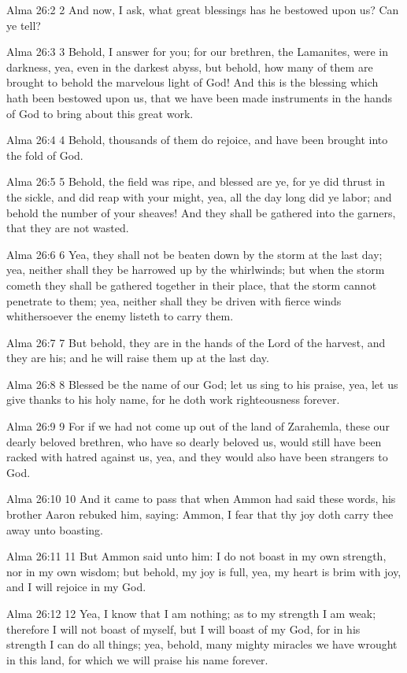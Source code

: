 Alma 26:2
 2 And now, I ask, what great blessings has he bestowed upon us?
Can ye tell?

Alma 26:3
 3 Behold, I answer for you; for our brethren, the Lamanites,
were in darkness, yea, even in the darkest abyss, but behold, how
many of them are brought to behold the marvelous light of God!
And this is the blessing which hath been bestowed upon us, that
we have been made instruments in the hands of God to bring about
this great work.

Alma 26:4
 4 Behold, thousands of them do rejoice, and have been brought
into the fold of God.

Alma 26:5
 5 Behold, the field was ripe, and blessed are ye, for ye did
thrust in the sickle, and did reap with your might, yea, all the
day long did ye labor; and behold the number of your sheaves!
And they shall be gathered into the garners, that they are not
wasted.

Alma 26:6
 6 Yea, they shall not be beaten down by the storm at the last
day; yea, neither shall they be harrowed up by the whirlwinds;
but when the storm cometh they shall be gathered together in
their place, that the storm cannot penetrate to them; yea,
neither shall they be driven with fierce winds whithersoever the
enemy listeth to carry them.

Alma 26:7
 7 But behold, they are in the hands of the Lord of the harvest,
and they are his; and he will raise them up at the last day.

Alma 26:8
 8 Blessed be the name of our God; let us sing to his praise,
yea, let us give thanks to his holy name, for he doth work
righteousness forever.

Alma 26:9
 9 For if we had not come up out of the land of Zarahemla, these
our dearly beloved brethren, who have so dearly beloved us, would
still have been racked with hatred against us, yea, and they
would also have been strangers to God.

Alma 26:10
 10 And it came to pass that when Ammon had said these words, his
brother Aaron rebuked him, saying: Ammon, I fear that thy joy
doth carry thee away unto boasting.

Alma 26:11
 11 But Ammon said unto him: I do not boast in my own strength,
nor in my own wisdom; but behold, my joy is full, yea, my heart
is brim with joy, and I will rejoice in my God.

Alma 26:12
 12 Yea, I know that I am nothing; as to my strength I am weak;
therefore I will not boast of myself, but I will boast of my God,
for in his strength I can do all things; yea, behold, many mighty
miracles we have wrought in this land, for which we will praise
his name forever.

